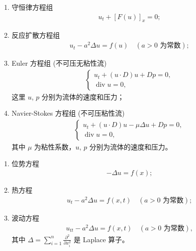 \documentclass[../../main.tex]{subfiles}%
\begin{document}
\begin{examples}[较著名的一些非线性偏微分方程组]
\begin{enumerate}[(1)]
\item 守恒律方程组
\begin{align*}
u_t + [F(u)]_x = 0;
\end{align*}

\item 反应扩散方程组
\begin{align*}
u_t - a^2 \Delta u = f(u) \quad (a > 0 \text{ 为常数});
\end{align*}

\item Euler 方程组 (不可压无粘性流)
\begin{align*}
\begin{cases}
u_t + (u\cdot D)u + Dp = 0, \\
\operatorname{div} u = 0,
\end{cases}
\end{align*}
这里 $u$, $p$ 分别为流体的速度和压力；

\item Navier-Stokes 方程组 (不可压粘性流)
\begin{align*}
\begin{cases}
u_t + (u\cdot D)u - \mu \Delta u + Dp = 0, \\
\operatorname{div} u = 0,
\end{cases}
\end{align*}
其中 $\mu$ 为粘性系数，$u$, $p$ 分别为流体的速度和压力。
\end{enumerate}
\end{examples}

\begin{examples}[三个典型的二阶线性偏微分方程]
\begin{enumerate}[(1)]
\item 位势方程
\begin{align}
-\Delta u = f(x); \label{eq:potential}
\end{align}

\item 热方程
\begin{align}
u_t - a^2 \Delta u = f(x,t) \quad (a > 0 \text{ 为常数}); \label{eq:heat}
\end{align}

\item 波动方程
\begin{align}
u_{tt} - a^2 \Delta u = f(x,t) \quad (a > 0 \text{ 为常数}), \label{eq:wave}
\end{align}
其中 $\Delta = \sum_{i=1}^n \frac{\partial^2}{\partial x_i^2}$ 是 Laplace 算子。
\end{enumerate}
\end{examples}
\end{document}
